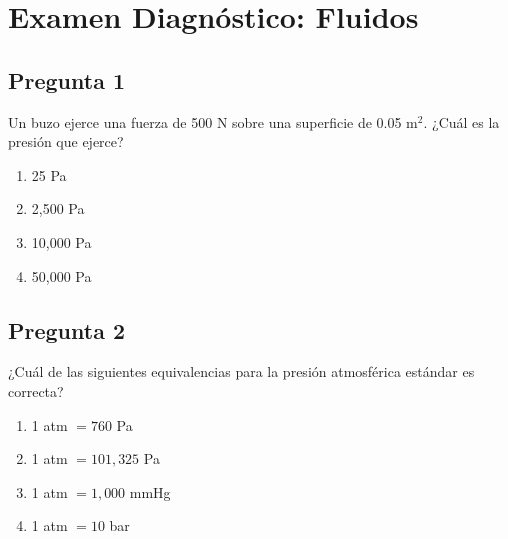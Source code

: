 
\renewcommand{\tema}{Examen Diagnóstico --- Fluidos}

\twocolumn

\section*{Examen Diagnóstico: Fluidos}


\begin{preguntabox}
\subsection*{Pregunta 1}
Un buzo ejerce una fuerza de 500 N sobre una superficie de 0.05 m$^2$. ¿Cuál es la presión que ejerce?

\begin{enumerate}
    \item[A)] 25 Pa
    \item[B)] 2{,}500 Pa
    \item[C)] 10{,}000 Pa
    \item[D)] 50{,}000 Pa
\end{enumerate}
\end{preguntabox}

\begin{preguntabox}
\subsection*{Pregunta 2}
¿Cuál de las siguientes equivalencias para la presión atmosférica estándar es correcta?

\begin{enumerate}
    \item[A)] 1 atm $= 760$ Pa
    \item[B)] 1 atm $= 101{,}325$ Pa
    \item[C)] 1 atm $= 1{,}000$ mmHg
    \item[D)] 1 atm $= 10$ bar
\end{enumerate}
\end{preguntabox}

